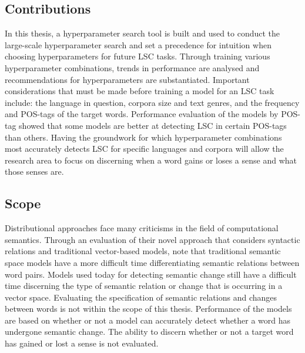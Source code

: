 \subsection{Contributions}
In this thesis, a hyperparameter search tool is built and used to conduct the large-scale hyperparameter search and set a precedence for intuition when choosing hyperparameters for future LSC tasks. Through training various hyperparameter combinations, trends in performance are analysed and recommendations for hyperparameters are substantiated. Important considerations that must be made before training a model for an LSC task include: the language in question, corpora size and text genres, and the frequency and POS-tags of the target words. Performance evaluation of the models by POS-tag showed that some models are better at detecting LSC in certain POS-tags than others. Having the groundwork for which hyperparameter combinations most accurately detects LSC for specific languages and corpora will allow the research area to focus on discerning when a word gains or loses a sense and what those senses are. 


\subsection{Scope}
\label{intro-scope}
Distributional approaches face many criticisms in the field of computational semantics. Through an evaluation of their novel approach that considers syntactic relations and traditional vector-based models, \citet{pado-lapata-2003-constructing} note that traditional semantic space models have a more difficult time differentiating semantic relations between word pairs. Models used today for detecting semantic change still have a difficult time discerning the type of semantic relation or change that is occurring in a vector space. Evaluating the specification of semantic relations and changes between words is not within the scope of this thesis. Performance of the models are based on whether or not a model can accurately detect whether a word has undergone semantic change. The ability to discern whether or not a target word has gained or lost a sense is not evaluated. 

